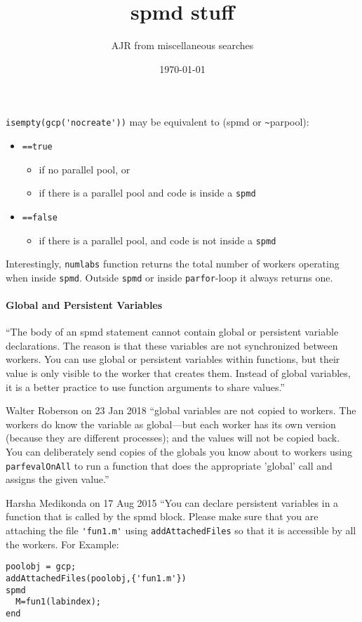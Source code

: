 \documentclass[11pt,a5paper]{article}
\title{spmd stuff}
\author{AJR from miscellaneous searches}
\date{\today}
\begin{document}
\maketitle



\verb|isempty(gcp('nocreate'))| may be equivalent to (spmd or \verb|~|parpool):
\begin{itemize}
\item \verb|==true| 
\begin{itemize}
\item if no parallel pool, or  
\item if there is a parallel pool and code is inside a \verb|spmd|
\end{itemize}


\item \verb|==false| 
\begin{itemize}
\item if there is a parallel pool, and code is not inside a \verb|spmd|
\end{itemize}

\end{itemize}


Interestingly, \verb|numlabs| function returns the total number of workers operating when inside \verb|spmd|.  Outside \verb|spmd| or inside \verb|parfor|-loop it always returns one.



\paragraph{Global and Persistent Variables}

``The body of an spmd statement cannot contain global or persistent variable declarations. The reason is that these variables are not synchronized between workers. You can use global or persistent variables within functions, but their value is only visible to the worker that creates them. Instead of global variables, it is a better practice to use function arguments to share values.''

Walter Roberson on 23 Jan 2018 \quad
``global variables are not copied to workers. The workers do know the variable as global---but each worker has its own version (because they are different processes); and the values will not be copied back.
You can deliberately send copies of the globals you know about to workers using \verb|parfevalOnAll| to run a function that does the appropriate 'global' call and assigns the given value.''


Harsha Medikonda on 17 Aug 2015 \quad
``You can declare persistent variables in a function that is called by the spmd block. Please make sure that you are attaching the file \verb|'fun1.m'| using \verb|addAttachedFiles| so that it is accessible by all the workers. For Example:
\begin{verbatim}
poolobj = gcp;
addAttachedFiles(poolobj,{'fun1.m'})
spmd         
  M=fun1(labindex);       
end
\end{verbatim}
\end{document}
